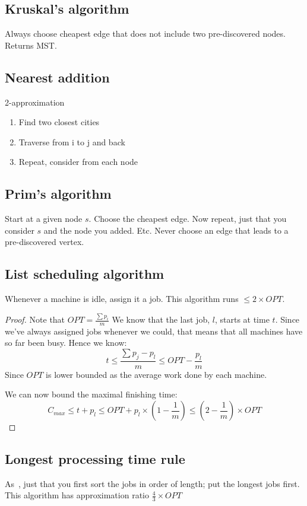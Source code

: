 \subsection{Kruskal's algorithm}
Always choose cheapest edge that does not include two pre-discovered nodes.
Returns MST.

\subsection{Nearest addition}
2-approximation
\begin{enumerate}
    \item Find two closest cities
    \item Traverse from i to j and back
    \item Repeat, consider from each node
\end{enumerate}

\subsection{Prim's algorithm}
Start at a given node $s$. Choose the cheapest edge. 
Now repeat, just that you consider $s$ and the node you added. Etc.
Never choose an edge that leads to a pre-discovered vertex.

\subsection{List scheduling algorithm}\label{listschedule}
    Whenever a machine is idle, assign it a job.
    This algorithm runs $\leq 2\times OPT$.

    \begin{proof}
        Note that $OPT = \frac{\sum{p_{i}}}{m}$
        We know that the last job, $l$, starts at time $t$. Since we've always
        assigned jobs whenever we could, that means that all machines have 
        so far been busy. Hence we know:
        $$
            t \leq \frac{\sum{p_{j} - p_{l}}}{m} \leq OPT - \frac{p_{l}}{m}
        $$
        Since $OPT$ is lower bounded as the average work done by each machine.

        We can now bound the maximal finishing time: 
        $$
            C_{max} \leq t + p_{l} \leq OPT + p_{l}\times (1 - \frac{1}{m}) 
            \leq (2 - \frac{1}{m})\times OPT
        $$
    \end{proof}

    \subsection{Longest processing time rule}\label{srpt}
    As~, just that you first sort the jobs in order of 
    length; put the longest jobs first. This algorithm has approximation ratio
    $\frac{4}{3} \times OPT$

